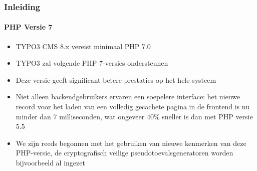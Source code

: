 \begin{frame}[fragile]
	\frametitle{Inleiding}
	\framesubtitle{PHP Versie 7}

	\begin{itemize}

		\item TYPO3 CMS 8.x vereist minimaal PHP 7.0
		\item TYPO3 zal volgende PHP 7-versies ondersteunen
		\item Deze versie geeft significant betere prestaties op het hele systeem

		\item Niet alleen backendgebruikers ervaren een soepelere interface: het
			nieuwe record voor het laden van een volledig gecachete pagina in de frontend is nu minder
			dan 7 milliseconden, wat ongeveer 40\% sneller is dan met PHP versie 5.5

		\item We zijn reeds begonnen met het gebruiken van nieuwe kenmerken van deze PHP-versie,
			de cryptografisch veilige pseudotoevalsgeneratoren worden bijvoorbeeld al ingezet

	\end{itemize}

\end{frame}

